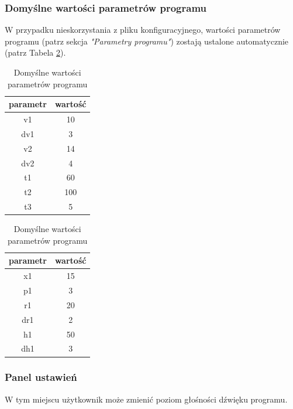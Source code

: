 \documentclass[a4paper]{article}
\begin{document}
\subsubsection{Domy\'slne warto\'sci parametr\'ow programu}
\quad W przypadku nieskorzystania z pliku konfiguracyjnego, warto\'sci parametr\'ow programu (patrz sekcja \textit{"Parametry programu"}) zostają ustalone automatycznie (patrz Tabela \ref{table:ta}).
\begin{table}[ht]
\centering
    \renewcommand{\arraystretch}{1.3}
    \begin{tabular}{|c|c|}
    \rowcolor{lightgray}
        \hline
        parametr&warto\'s\'c \\
        \hline
        v1&10\\
        \hline
        dv1&3\\
        \hline
        v2&14\\
        \hline
        dv2&4\\
        \hline
        t1&60\\
        \hline
        t2&100\\
        \hline
        t3&5\\
        \hline
\end{tabular}
\quad
    \begin{tabular}{|c|c|}
    \rowcolor{lightgray}
        \hline 
        parametr&warto\'s\'c\\
        \hline
        x1&15\\ 
        \hline
        p1&3\\
        \hline
        r1&20\\
        \hline
        dr1&2\\
        \hline
        h1&50\\
        \hline
        dh1&3\\
        \hline
\end{tabular}
\color{lightgray}\caption{Domy\'slne warto\'sci parametr\'ow programu}
\label{table:ta}
\end{table}


\subsubsection{Panel ustawie\'n}
\quad W tym miejscu u\.zytkownik mo\.ze zmieni\'c poziom g\l{}o\'sno\'sci d\'zwi\k{e}ku programu.
\end{document}
